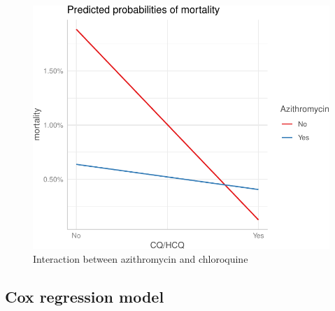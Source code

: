 \documentclass[
  10pt,
]{article}
\begin{document}
\begin{figure}[h]

{\centering \includegraphics{results_files/figure-latex/interaction-plot-1} 

}

\caption{Interaction between azithromycin and chloroquine}\label{fig:interaction-plot}
\end{figure}

\clearpage

\hypertarget{cox-regression-model}{%
\subsection{Cox regression model}\label{cox-regression-model}}

 
  \providecommand{\huxb}[2]{\arrayrulecolor[RGB]{#1}\global\arrayrulewidth=#2pt}
  \providecommand{\huxvb}[2]{\color[RGB]{#1}\vrule width #2pt}
  \providecommand{\huxtpad}[1]{\rule{0pt}{#1}}
  \providecommand{\huxbpad}[1]{\rule[-#1]{0pt}{#1}}
\end{document}
